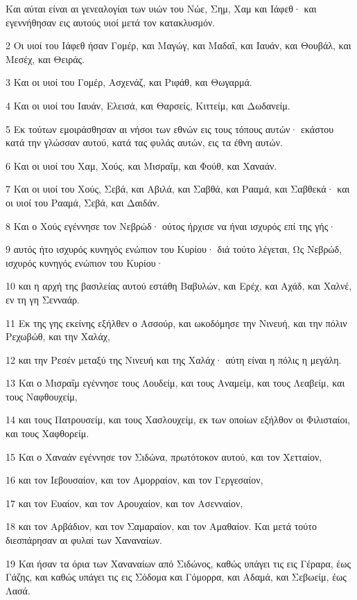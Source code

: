 \par Και αύται είναι αι γενεαλογίαι των υιών του Νώε, Σημ, Χαμ και Ιάφεθ· και εγεννήθησαν εις αυτούς υιοί μετά τον κατακλυσμόν.
\par 2 Οι υιοί του Ιάφεθ ήσαν Γομέρ, και Μαγώγ, και Μαδαΐ, και Ιαυάν, και Θουβάλ, και Μεσέχ, και Θειράς.
\par 3 Και οι υιοί του Γομέρ, Ασχενάζ, και Ριφάθ, και Θωγαρμά.
\par 4 Και οι υιοί του Ιαυάν, Ελεισά, και Θαρσείς, Κιττείμ, και Δωδανείμ.
\par 5 Εκ τούτων εμοιράσθησαν αι νήσοι των εθνών εις τους τόπους αυτών· εκάστου κατά την γλώσσαν αυτού, κατά τας φυλάς αυτών, εις τα έθνη αυτών.
\par 6 Και οι υιοί του Χαμ, Χούς, και Μισραΐμ, και Φούθ, και Χαναάν.
\par 7 Και οι υιοί του Χούς, Σεβά, και Αβιλά, και Σαβθά, και Ρααμά, και Σαβθεκά· και οι υιοί του Ρααμά, Σεβά, και Δαιδάν.
\par 8 Και ο Χούς εγέννησε τον Νεβρώδ· ούτος ήρχισε να ήναι ισχυρός επί της γής·
\par 9 αυτός ήτο ισχυρός κυνηγός ενώπιον του Κυρίου· διά τούτο λέγεται, Ως Νεβρώδ, ισχυρός κυνηγός ενώπιον του Κυρίου·
\par 10 και η αρχή της βασιλείας αυτού εστάθη Βαβυλών, και Ερέχ, και Αχάδ, και Χαλνέ, εν τη γη Σενναάρ.
\par 11 Εκ της γης εκείνης εξήλθεν ο Ασσούρ, και ωκοδόμησε την Νινευή, και την πόλιν Ρεχωβώθ, και την Χαλάχ,
\par 12 και την Ρεσέν μεταξύ της Νινευή και της Χαλάχ· αύτη είναι η πόλις η μεγάλη.
\par 13 Και ο Μισραΐμ εγέννησε τους Λουδείμ, και τους Αναμείμ, και τους Λεαβείμ, και τους Ναφθουχείμ,
\par 14 και τους Πατρουσείμ, και τους Χασλουχείμ, εκ των οποίων εξήλθον οι Φιλισταίοι, και τους Χαφθορείμ.
\par 15 Και ο Χαναάν εγέννησε τον Σιδώνα, πρωτότοκον αυτού, και τον Χετταίον,
\par 16 και τον Ιεβουσαίον, και τον Αμορραίον, και τον Γεργεσαίον,
\par 17 και τον Ευαίον, και τον Αρουχαίον, και τον Ασενναίον,
\par 18 και τον Αρβάδιον, και τον Σαμαραίον, και τον Αμαθαίον. Και μετά τούτο διεσπάρησαν αι φυλαί των Χαναναίων.
\par 19 Και ήσαν τα όρια των Χαναναίων από Σιδώνος, καθώς υπάγει τις εις Γέραρα, έως Γάζης, και καθώς υπάγει τις εις Σόδομα και Γόμορρα, και Αδαμά, και Σεβωείμ, έως Λασά.
